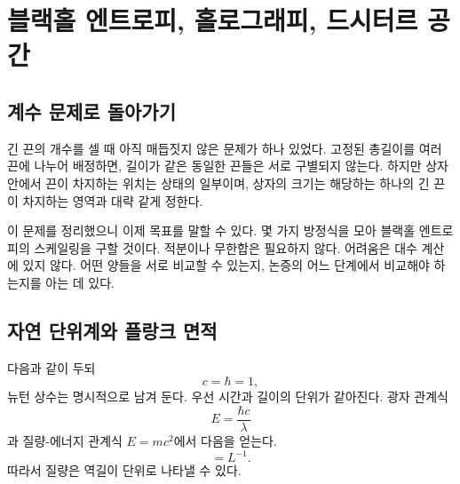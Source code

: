 \chapter{블랙홀 엔트로피, 홀로그래피, 드시터르 공간}


\section{계수 문제로 돌아가기}

긴 끈의 개수를 셀 때 아직 매듭짓지 않은 문제가 하나 있었다. 고정된 총길이를 여러 끈에 나누어 배정하면, 길이가 같은 동일한 끈들은 서로 구별되지 않는다. 하지만 상자 안에서 끈이 차지하는 위치는 상태의 일부이며, 상자의 크기는 해당하는 하나의 긴 끈이 차지하는 영역과 대략 같게 정한다.

\begin{classroomqa}
\end{classroomqa}

이 문제를 정리했으니 이제 목표를 말할 수 있다. 몇 가지 방정식을 모아 블랙홀 엔트로피의 스케일링을 구할 것이다. 적분이나 무한합은 필요하지 않다. 어려움은 대수 계산에 있지 않다. 어떤 양들을 서로 비교할 수 있는지, 논증의 어느 단계에서 비교해야 하는지를 아는 데 있다.

\section{자연 단위계와 플랑크 면적}

다음과 같이 두되
\begin{equation}
c=\hbar=1,
\label{eq:l07-natural-units}
\end{equation}
뉴턴 상수는 명시적으로 남겨 둔다. 우선 시간과 길이의 단위가 같아진다. 광자 관계식
\begin{equation}
E=\frac{\hbar c}{\lambda}
\end{equation}
과 질량-에너지 관계식 \(E=mc^2\)에서 다음을 얻는다.
\begin{equation}
[M]=L^{-1}.
\label{eq:l07-mass-dimension}
\end{equation}
따라서 질량은 역길이 단위로 나타낼 수 있다.

